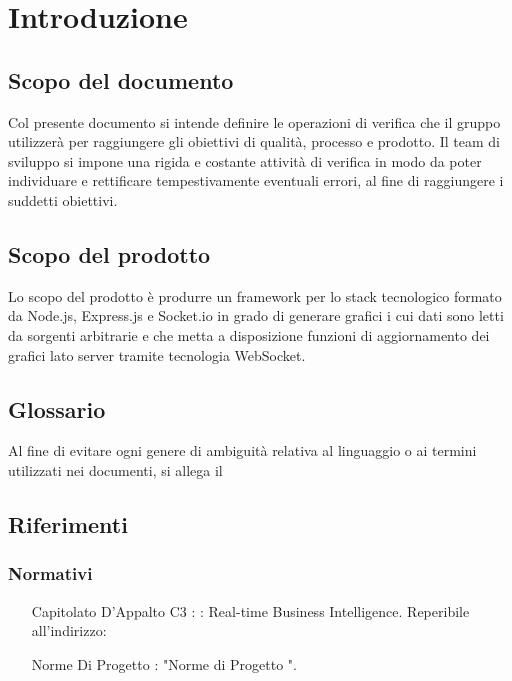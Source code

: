 
\section{Introduzione}
	\subsection{Scopo del documento}
		Col presente documento si intende definire le operazioni di verifica che il gruppo \groupname utilizzerà per raggiungere gli obiettivi di qualità, processo e prodotto. Il team di sviluppo si impone una rigida e costante attività di verifica in modo da poter individuare e rettificare tempestivamente eventuali errori, al fine di raggiungere i suddetti obiettivi. 
	\subsection{Scopo del prodotto}
		Lo scopo del prodotto è produrre un framework per lo stack tecnologico formato da Node.js, Express.js e Socket.io in grado di generare grafici i cui dati sono letti da sorgenti arbitrarie e che metta a disposizione funzioni di aggiornamento dei grafici lato server tramite tecnologia WebSocket.
	\subsection{Glossario}
		Al fine di evitare ogni genere di ambiguità relativa al linguaggio o ai termini utilizzati nei documenti, si allega il 
	\subsection{Riferimenti}
		\subsubsection{Normativi}
			\begin{itemize}
				\item[Capitolato D'Appalto C3]: \projectname: Real-time Business Intelligence. Reperibile all'indirizzo: 
				\item[Norme Di Progetto]: "Norme di Progetto \lastversion".
			\end{itemize}
